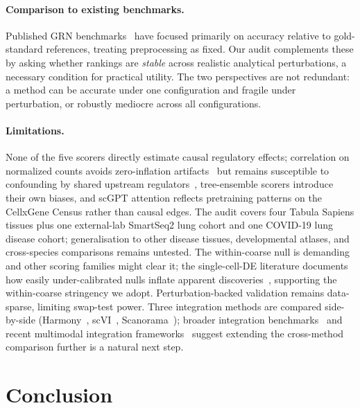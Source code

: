 \documentclass[12pt]{article}
\begin{document}
\paragraph{Comparison to existing benchmarks.}
Published GRN benchmarks~\citep{Pratapa2020, Chen2018} have focused primarily on
accuracy relative to gold-standard references, treating preprocessing as fixed.
Our audit complements these by asking whether rankings are \emph{stable} across
realistic analytical perturbations, a necessary condition for practical utility.
The two perspectives are not redundant: a method can be accurate under one
configuration and fragile under perturbation, or robustly mediocre across all
configurations.

\paragraph{Limitations.}
None of the five scorers directly estimate causal regulatory effects;
correlation on normalized counts avoids zero-inflation
artifacts~\citep{Svensson2020} but remains susceptible to confounding
by shared upstream regulators~\citep{Kharchenko2014}, tree-ensemble
scorers introduce their own biases, and scGPT attention reflects
pretraining patterns on the CellxGene Census rather than causal edges.
The audit covers four Tabula Sapiens tissues plus one external-lab
SmartSeq2 lung cohort and one COVID-19 lung disease cohort;
generalisation to other disease tissues, developmental atlases, and
cross-species comparisons remains untested. The within-coarse null is
demanding and other scoring families might clear it; the
single-cell-DE literature documents how easily under-calibrated nulls
inflate apparent
discoveries~\citep{Squair2021}, supporting the within-coarse stringency
we adopt. Perturbation-backed validation remains data-sparse, limiting
swap-test power. Three integration methods are compared side-by-side
(Harmony~\citep{Korsunsky2019}, scVI~\citep{Gayoso2022},
Scanorama~\citep{Hie2019}); broader integration
benchmarks~\citep{Luecken2022, Tran2020} and recent multimodal
integration frameworks~\citep{Hao2024} suggest extending the
cross-method comparison further is a natural next step.

\section{Conclusion}
\end{document}
